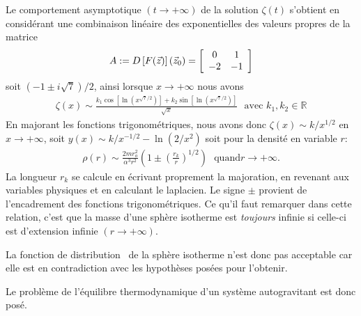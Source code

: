 Le comportement asymptotique $\left(t\rightarrow+\infty\right)$ de la
solution $\zeta(t)$ s'obtient en considérant une combinaison linéaire
des exponentielles des valeurs propres de la matrice
\begin{align*}
	A:=D\left[F(\vec{z})\right](\vec{z}_0)=\left[
\begin{array}
[c]{cc}%
0     & 1\\
-2 & -1\\
\end{array}
\right]
\end{align*}
soit $\left(  -1\pm i\sqrt
{7}\right)  /2$, ainsi lorsque $x\rightarrow+\infty$ nous avons
\begin{align*}
\zeta\left(  x\right)
\sim\frac{k_{1}\cos\left[  \ln\left(  x^{\sqrt{7}/2}\right)  \right]
+k_{2}\sin\left[  \ln\left(  x^{\sqrt{7}/2}\right)  \right]  }{\sqrt{x}%
}\ \ \ \text{avec }k_{1},k_{2}\in\mathbb{R}%
\end{align*}
En majorant les fonctions trigonométriques, nous avons donc $\zeta\left(
x\right)  \sim k/x^{1/2}$ en $x\rightarrow+\infty$, soit $y\left(  x\right)
\sim k/x^{-1/2}-\ln\left(  2/x^{2}\right)  $ soit pour la densité en
variable $r$:
\begin{align}
\rho\left(  r\right)  \sim\frac{2mr_{o}^{2}}{\alpha^{3}r^{2}}\left(
1\pm\left(  \frac{r_{k}}{r}\right)  ^{1/2}\right)  \ \ \ \text{quand
}r\rightarrow+\infty\text{.}\label{asymp_sph_iso}%
\end{align}
La longueur $r_{k}$ se calcule en écrivant proprement la majoration, en
revenant aux variables physiques et en calculant le laplacien. Le signe $\pm$ provient de l'encadrement des fonctions
trigonométriques. Ce qu'il faut remarquer dans cette
relation, c'est que la masse d'une sphère isotherme est \emph{toujours} infinie si
celle-ci est d'extension infinie $\left(  r\rightarrow+\infty\right)$.

La fonction de distribution~ de la sphère isotherme n'est donc pas acceptable car elle est en contradiction avec les hypothèses posées pour l'obtenir.

Le problème de l'équilibre thermodynamique d'un système autogravitant est donc posé.


